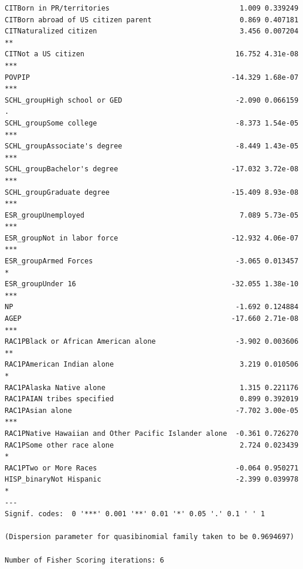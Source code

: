 \documentclass[
  letterpaper,
  DIV=11,
  numbers=noendperiod]{scrartcl}
\begin{document}
\begin{verbatim}
CITBorn in PR/territories                               1.009 0.339249    
CITBorn abroad of US citizen parent                     0.869 0.407181    
CITNaturalized citizen                                  3.456 0.007204 ** 
CITNot a US citizen                                    16.752 4.31e-08 ***
POVPIP                                                -14.329 1.68e-07 ***
SCHL_groupHigh school or GED                           -2.090 0.066159 .  
SCHL_groupSome college                                 -8.373 1.54e-05 ***
SCHL_groupAssociate's degree                           -8.449 1.43e-05 ***
SCHL_groupBachelor's degree                           -17.032 3.72e-08 ***
SCHL_groupGraduate degree                             -15.409 8.93e-08 ***
ESR_groupUnemployed                                     7.089 5.73e-05 ***
ESR_groupNot in labor force                           -12.932 4.06e-07 ***
ESR_groupArmed Forces                                  -3.065 0.013457 *  
ESR_groupUnder 16                                     -32.055 1.38e-10 ***
NP                                                     -1.692 0.124884    
AGEP                                                  -17.660 2.71e-08 ***
RAC1PBlack or African American alone                   -3.902 0.003606 ** 
RAC1PAmerican Indian alone                              3.219 0.010506 *  
RAC1PAlaska Native alone                                1.315 0.221176    
RAC1PAIAN tribes specified                              0.899 0.392019    
RAC1PAsian alone                                       -7.702 3.00e-05 ***
RAC1PNative Hawaiian and Other Pacific Islander alone  -0.361 0.726270    
RAC1PSome other race alone                              2.724 0.023439 *  
RAC1PTwo or More Races                                 -0.064 0.950271    
HISP_binaryNot Hispanic                                -2.399 0.039978 *  
---
Signif. codes:  0 '***' 0.001 '**' 0.01 '*' 0.05 '.' 0.1 ' ' 1

(Dispersion parameter for quasibinomial family taken to be 0.9694697)

Number of Fisher Scoring iterations: 6
\end{verbatim}
\end{document}
